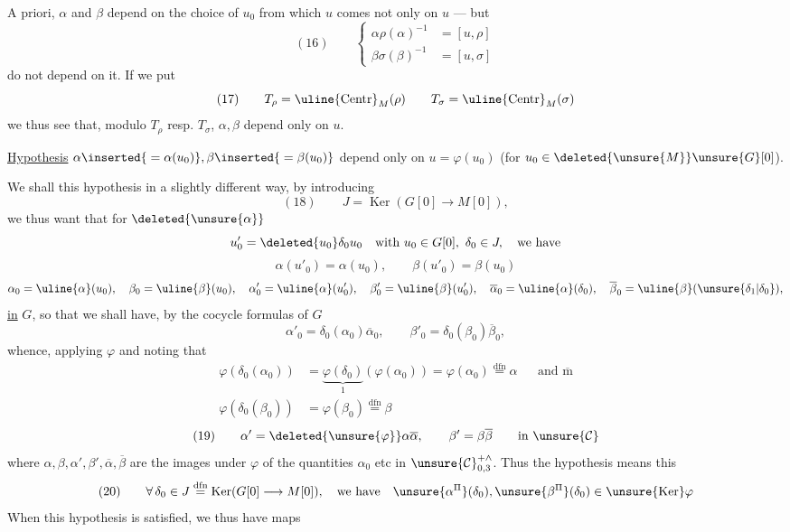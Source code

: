
A priori, $\alpha$ and $\beta$ depend on the choice of $u_0$ from which $u$ comes
not only on $u$ --- but
\[
(16)\qquad
\left\{\begin{aligned}
\alpha\rho(\alpha)^{-1}&=[u,\rho]\\
\beta\sigma(\beta)^{-1}&=[u,\sigma]
\end{aligned}\right.
\]
do not depend on it. If we put
\[
(17)\qquad
T_{\rho}=\uline{\mathrm{Centr}}_M(\rho)
\qquad
T_{\sigma}=\uline{\mathrm{Centr}}_M(\sigma)
\]
we thus see that, modulo $T_{\rho}$ resp. $T_{\sigma}$,
$\alpha,\beta$ depend only on $u$.

\uline{Hypothesis}
$\alpha\inserted{{}=\alpha(u_0)},\beta\inserted{{}=\beta(u_0)}$
depend only on $u=\varphi(u_0)$
(for $u_0\in\deleted{\unsure{M}}\unsure{G}[0]$).

We shall  this hypothesis in a slightly different way,
by introducing
\[
(18)\qquad J=\operatorname{Ker}(G[0]\longrightarrow M[0]),
\]
we thus want that for $\deleted{\unsure{\alpha}}$
\[
u'_0=\deleted{u_0}\delta_0u_0\quad
\text{with }u_0\in G[0],\ \delta_0\in J,\quad\text{we have}
\]
\[
\alpha(u'_0)=\alpha(u_0),\qquad \beta(u'_0)=\beta(u_0)
\]
\[
\begin{gathered}
\alpha_0=\uline{\alpha}(u_0),\quad
\beta_0=\uline{\beta}(u_0),\quad
\alpha'_0=\uline{\alpha}(u'_0),\quad
\beta'_0=\uline{\beta}(u'_0),\quad
\overline{\alpha}_0=\uline{\alpha}(\delta_0),\quad
\overline{\beta}_0=\uline{\beta}(\unsure{\delta_1|\delta_0}),
\end{gathered}
\]
\uline{in} $G$, so that we shall have, by the cocycle formulas of $G$
\[
\alpha'_0=\delta_0(\alpha_0)\overline{\alpha}_0,
\qquad
\beta'_0=\delta_0(\beta_0)\overline{\beta}_0,
\]
whence, applying $\varphi$ and noting that
\[
\begin{aligned}
\varphi(\delta_0(\alpha_0))
&=\underbrace{\varphi(\delta_0)}_{1}(\varphi(\alpha_0))
=\varphi(\alpha_0)\overset{\mathrm{dfn}}=\alpha
&&\text{and }\overline{\mathrm m}\\
\varphi(\delta_0(\beta_0))&=\varphi(\beta_0)\overset{\mathrm{dfn}}=\beta
\end{aligned}
\]
\[
(19)\qquad
\alpha'=\deleted{\unsure{\varphi}}\alpha\overline{\alpha},\qquad
\beta'=\beta\overline{\beta}\qquad\text{in }\unsure{\mathcal{C}}
\]
where $\alpha,\beta,\alpha',\beta',\overline{\alpha},\overline{\beta}$ are the images under
$\varphi$ of the quantities $\alpha_0$ etc in $\unsure{\mathcal{C}}_{0,3}^{+\wedge}$.
Thus the hypothesis means this
\[
(20)\qquad
\forall\,\delta_0\in J\overset{\mathrm{dfn}}=
\operatorname{Ker}(G[0]\longrightarrow M[0]),\quad
\text{we have}\quad
\unsure{\alpha^{\Pi}}(\delta_0),\unsure{\beta^{\Pi}}(\delta_0)
\in\unsure{\operatorname{Ker}}\varphi
\]
When this hypothesis is satisfied, we thus have maps

